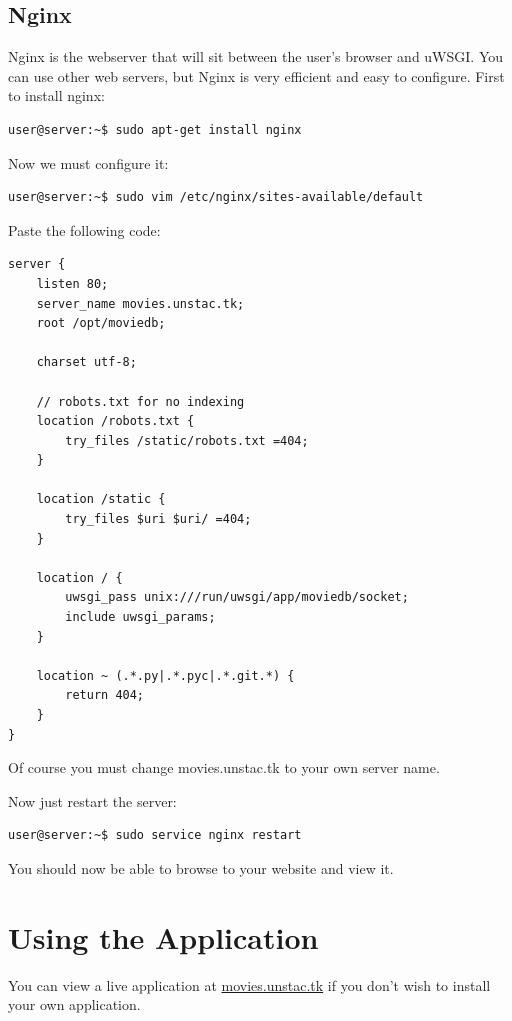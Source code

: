 \documentclass[10pt,a4paper]{scrreprt}
\begin{document}
\section{Nginx}
Nginx is the webserver that will sit between the user's browser and uWSGI. You can use other web servers, but Nginx is very efficient and easy to configure. First to install nginx:

\begin{verbatim}
user@server:~$ sudo apt-get install nginx
\end{verbatim}

Now we must configure it:

\begin{verbatim}
user@server:~$ sudo vim /etc/nginx/sites-available/default
\end{verbatim}

Paste the following code:

\begin{verbatim}
server {
    listen 80; 
    server_name movies.unstac.tk;
    root /opt/moviedb;

    charset utf-8;

    // robots.txt for no indexing
    location /robots.txt {
        try_files /static/robots.txt =404;
    }   

    location /static {
        try_files $uri $uri/ =404;
    }   

    location / { 
        uwsgi_pass unix:///run/uwsgi/app/moviedb/socket;
        include uwsgi_params;
    }   

    location ~ (.*.py|.*.pyc|.*.git.*) {
        return 404;
    }   
}
\end{verbatim}

Of course you must change movies.unstac.tk to your own server name.

Now just restart the server:

\begin{verbatim}
user@server:~$ sudo service nginx restart
\end{verbatim}

You should now be able to browse to your website and view it.

\chapter{Using the Application}
You can view a live application at \href{http://movies.unstac.tk/}{movies.unstac.tk} if you don't wish to install your own application.
\end{document}
